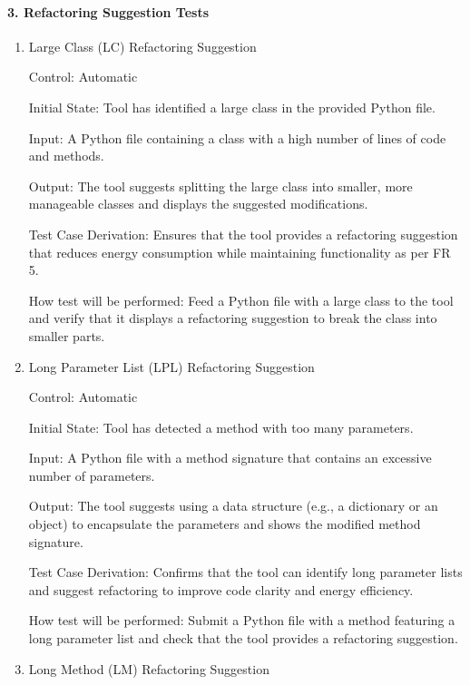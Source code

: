 \documentclass[12pt, titlepage]{article}
\begin{document}
\paragraph{3. Refactoring Suggestion Tests}
\begin{enumerate}
  \item{Large Class (LC) Refactoring Suggestion\\}

  Control: Automatic
            
  Initial State: Tool has identified a large class in the provided Python file.
            
  Input: A Python file containing a class with a high number of lines of code and methods.
            
  Output: The tool suggests splitting the large class into smaller, more manageable classes and displays the suggested modifications.
  
  Test Case Derivation: Ensures that the tool provides a refactoring suggestion that reduces energy consumption while maintaining functionality as per FR 5.
            
  How test will be performed: Feed a Python file with a large class to the tool and verify that it displays a refactoring suggestion to break the class into smaller parts.
  
  \item{Long Parameter List (LPL) Refactoring Suggestion\\}
  
  Control: Automatic
            
  Initial State: Tool has detected a method with too many parameters.
            
  Input: A Python file with a method signature that contains an excessive number of parameters.
            
  Output: The tool suggests using a data structure (e.g., a dictionary or an object) to encapsulate the parameters and shows the modified method signature.
  
  Test Case Derivation: Confirms that the tool can identify long parameter lists and suggest refactoring to improve code clarity and energy efficiency.
            
  How test will be performed: Submit a Python file with a method featuring a long parameter list and check that the tool provides a refactoring suggestion.
  
  \item{Long Method (LM) Refactoring Suggestion\\}
  

\end{enumerate}
\end{document}
